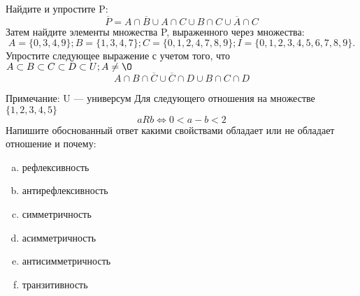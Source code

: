 \documentclass[10pt]{exam}
\begin{document}
\begin{questions}
\question
Найдите и упростите P:
\begin{equation*}
\overline{P} = A \cap \overline{B} \cup A \cap C \cup B \cap C \cup \overline{A} \cap C
\end{equation*}
Затем найдите элементы множества P, выраженного через множества:
\begin{equation*}
A = \{0, 3, 4, 9\}; 
B = \{1, 3, 4, 7\};
C = \{0, 1, 2, 4, 7, 8, 9\};
I = \{0, 1, 2, 3, 4, 5, 6, 7, 8, 9\}.
\end{equation*}\question
Упростите следующее выражение с учетом того, что $A\subset B \subset C \subset D \subset U; A \neq \O$
\begin{equation*}
A \cap B  \cap \overline{C} \cup \overline{C} \cap D \cup B \cap C \cap D
\end{equation*}

Примечание: U — универсум\question
Для следующего отношения на множестве $\{1, 2, 3, 4, 5\}$ 
\begin{equation*}
aRb \iff 0 < a-b<2
\end{equation*}
Напишите обоснованный ответ какими свойствами обладает или не обладает отношение и почему:   
\begin{enumerate} [a)]\setcounter{enumi}{0}
\item рефлексивность
\item антирефлексивность
\item симметричность
\item асимметричность
\item антисимметричность
\item транзитивность
\end{enumerate}


\end{questions}
\end{document}
